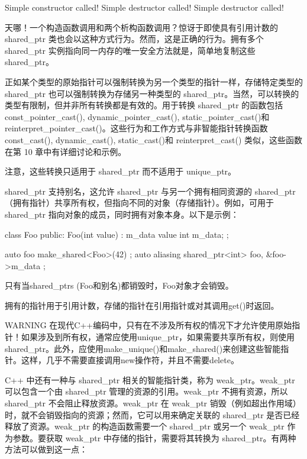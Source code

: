 \begin{shell}
Simple constructor called!
Simple destructor called!
Simple destructor called!
\end{shell}

天哪！一个构造函数调用和两个析构函数调用？惊讶于即使具有引用计数的 shared\_ptr 类也会以这种方式行为。然而，这是正确的行为。拥有多个 shared\_ptr 实例指向同一内存的唯一安全方法就是，简单地复制这些 shared\_ptr。


正如某个类型的原始指针可以强制转换为另一个类型的指针一样，存储特定类型的 shared\_ptr 也可以强制转换为存储另一种类型的 shared\_ptr。当然，可以转换的类型有限制，但并非所有转换都是有效的。用于转换 shared\_ptr 的函数包括 const\_pointer\_cast(), dynamic\_pointer\_cast(), static\_pointer\_cast()和 reinterpret\_pointer\_cast()。这些行为和工作方式与非智能指针转换函数 const\_cast(), dynamic\_cast(), static\_cast()和 reinterpret\_cast() 类似，这些函数在第 10 章中有详细讨论和示例。

注意，这些转换只适用于 shared\_ptr 而不适用于 unique\_ptr。


shared\_ptr 支持别名，这允许 shared\_ptr 与另一个拥有相同资源的 shared\_ptr（拥有指针）共享所有权，但指向不同的对象（存储指针）。例如，可用于 shared\_ptr 指向对象的成员，同时拥有对象本身。以下是示例：

\begin{cpp}
class Foo
{
    public:
    Foo(int value) : m_data { value } { }
    int m_data;
};

auto foo { make_shared<Foo>(42) };
auto aliasing { shared_ptr<int> { foo, &foo->m_data } };
\end{cpp}

只有当shared\_ptrs (Foo和别名)都销毁时，Foo对象才会销毁。

拥有的指针用于引用计数，存储的指针在引用指针或对其调用get()时返回。

\begin{myWarning}{WARNING}
在现代C++编码中，只有在不涉及所有权的情况下才允许使用原始指针！如果涉及到所有权，通常应使用unique\_ptr，如果需要共享所有权，则使用shared\_ptr。此外，应使用make\_unique()和make\_shared()来创建这些智能指针。这样，几乎不需要直接调用new操作符，并且不需要delete。
\end{myWarning}


C++ 中还有一种与 shared\_ptr 相关的智能指针类，称为 weak\_ptr。weak\_ptr 可以包含一个由 shared\_ptr 管理的资源的引用。weak\_ptr 不拥有资源，所以 shared\_ptr 不会阻止释放资源。weak\_ptr 在 weak\_ptr 销毁（例如超出作用域）时，就不会销毁指向的资源；然而，它可以用来确定关联的 shared\_ptr 是否已经释放了资源。weak\_ptr 的构造函数需要一个 shared\_ptr 或另一个 weak\_ptr 作为参数。要获取 weak\_ptr 中存储的指针，需要将其转换为 shared\_ptr。有两种方法可以做到这一点：

